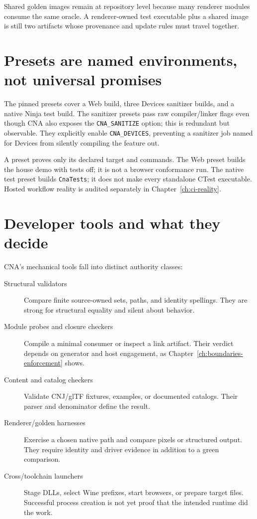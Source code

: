 Shared golden images remain at repository level because many renderer modules consume the same
oracle.  A renderer-owned test executable plus a shared image is still two artifacts whose
provenance and update rules must travel together.

\section{Presets are named environments, not universal promises}

The pinned presets cover a Web build, three Devices sanitizer builds, and a native Ninja test
build.  The sanitizer presets pass raw compiler/linker flags even though CNA also exposes the
\texttt{CNA\_SANITIZE} option; this is redundant but observable.  They explicitly enable
\texttt{CNA\_DEVICES}, preventing a sanitizer job named for Devices from silently compiling the
feature out.

A preset proves only its declared target and commands.  The Web preset builds the house demo with
tests off; it is not a browser conformance run.  The native test preset builds \texttt{CnaTests}; it
does not make every standalone CTest executable.  Hosted workflow reality is audited separately in
Chapter~\ref{ch:ci-reality}.

\section{Developer tools and what they decide}

CNA's mechanical tools fall into distinct authority classes:

\begin{description}
  \item[Structural validators] Compare finite source-owned sets, paths, and identity
        spellings.  They are strong for structural equality and silent about behavior.
  \item[Module probes and closure checkers] Compile a minimal consumer or inspect a link artifact.
        Their verdict depends on generator and host engagement, as Chapter~\ref{ch:boundaries-enforcement}
        shows.
  \item[Content and catalog checkers] Validate CNJ/glTF fixtures, examples, or documented catalogs.
        Their parser and denominator define the result.
  \item[Renderer/golden harnesses] Exercise a chosen native path and compare pixels or structured
        output.  They require identity and driver evidence in addition to a green comparison.
  \item[Cross/toolchain launchers] Stage DLLs, select Wine prefixes, start browsers, or prepare
        target files.  Successful process creation is not yet proof that the intended runtime did
        the work.
\end{description}

